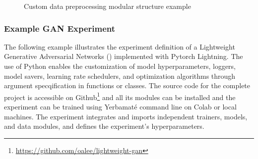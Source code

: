 
\begin{figure}[h!]
\centering
{}
\caption{
Custom data preprocessing modular structure example
}
\label{customdata}
\end{figure}


\subsubsection{Example GAN Experiment}

The following example illustrates the experiment definition of a Lightweight Generative Adversarial Networks (\cite{lgan,goodfellow2020generative}) implemented with Pytorch Lightning. The use of Python enables the customization of model hyperparameters, loggers, model savers, learning rate schedulers, and optimization algorithms through argument specqification in functions or classes. The source code for the complete project is accessible on Github\footnote{\url{https://github.com/oalee/lightweight-gan}} and all its modules can be installed and the experiment can be trained using Yerbamaté command line on Colab or local machines. The experiment integrates and imports independent trainers, models, and data modules, and defines the experiment's hyperparameters.



